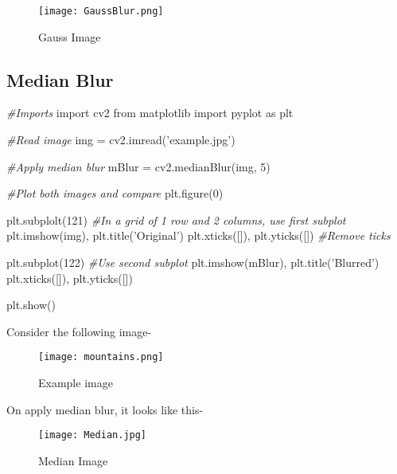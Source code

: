 \documentclass[]{article}
\newenvironment{Shaded}{}{}
\newcommand{\DecValTok}[1]{\textcolor[rgb]{0.25,0.63,0.44}{{#1}}}
\newcommand{\StringTok}[1]{\textcolor[rgb]{0.25,0.44,0.63}{{#1}}}
\newcommand{\ImportTok}[1]{{#1}}
\newcommand{\CommentTok}[1]{\textcolor[rgb]{0.38,0.63,0.69}{\textit{{#1}}}}
\newcommand{\OperatorTok}[1]{\textcolor[rgb]{0.40,0.40,0.40}{{#1}}}
\newcommand{\NormalTok}[1]{{#1}}
\begin{document}
\begin{figure}[htbp]
\centering
\texttt{[image: GaussBlur.png]}
\caption{Gauss Image}
\end{figure}

\subsection{Median Blur}\label{median-blur-1}

\begin{Shaded}
\begin{Highlighting}[]
    \CommentTok{#Imports}
    \ImportTok{import} \NormalTok{cv2}
    \ImportTok{from} \NormalTok{matplotlib }\ImportTok{import} \NormalTok{pyplot }\ImportTok{as} \NormalTok{plt}
    
    \CommentTok{#Read image}
    \NormalTok{img }\OperatorTok{=} \NormalTok{cv2.imread(}\StringTok{'example.jpg'}\NormalTok{)}

    \CommentTok{#Apply median blur}
     \NormalTok{mBlur }\OperatorTok{=} \NormalTok{cv2.medianBlur(img, }\DecValTok{5}\NormalTok{)}

    \CommentTok{#Plot both images and compare}
    \NormalTok{plt.figure(}\DecValTok{0}\NormalTok{)}
    
    \NormalTok{plt.subplolt(}\DecValTok{121}\NormalTok{) }\CommentTok{#In a grid of 1 row and 2 columns, use first subplot}
    \NormalTok{plt.imshow(img), plt.title(}\StringTok{'Original'}\NormalTok{)}
    \NormalTok{plt.xticks([]), plt.yticks([]) }\CommentTok{#Remove ticks}

    \NormalTok{plt.subplot(}\DecValTok{122}\NormalTok{) }\CommentTok{#Use second subplot}
    \NormalTok{plt.imshow(mBlur), plt.title(}\StringTok{'Blurred'}\NormalTok{)}
    \NormalTok{plt.xticks([]), plt.yticks([])}

    \NormalTok{plt.show()}
\end{Highlighting}
\end{Shaded}

Consider the following image-

\begin{figure}[htbp]
\centering
\texttt{[image: mountains.png]}
\caption{Example image}
\end{figure}

On apply median blur, it looks like this-

\begin{figure}[htbp]
\centering
\texttt{[image: Median.jpg]}
\caption{Median Image}
\end{figure}
\end{document}

